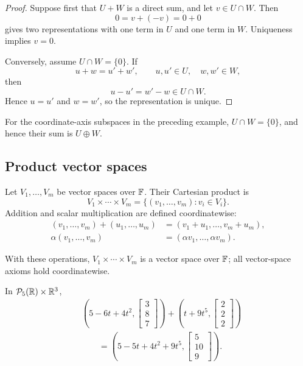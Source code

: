 \begin{proof}
  Suppose first that $U+W$ is a direct sum, and let $v\in U\cap W$.
  Then
  \[
    0=v+(-v)=0+0
  \]
  gives two representations with one term in $U$ and one term in $W$.
  Uniqueness implies $v=0$.

  Conversely, assume $U\cap W=\{0\}$. If
  \[
    u+w=u'+w',
    \qquad u,u'\in U,\quad w,w'\in W,
  \]
  then
  \[
    u-u'=w'-w\in U\cap W.
  \]
  Hence $u=u'$ and $w=w'$, so the representation is unique.
\end{proof}

For the coordinate-axis subspaces in the preceding example,
$U\cap W=\{0\}$, and hence their sum is $U\oplus W$.

\subsection{Product vector spaces}

\begin{definition}
  Let $V_1,\ldots,V_m$ be vector spaces over $\mathbb{F}$. Their Cartesian
  product is
  \[
    V_1\times\cdots\times V_m
    =\{(v_1,\ldots,v_m):v_i\in V_i\}.
  \]
  Addition and scalar multiplication are defined coordinatewise:
  \begin{align*}
    (v_1,\ldots,v_m)+(u_1,\ldots,u_m)
      &=(v_1+u_1,\ldots,v_m+u_m), \\
    \alpha(v_1,\ldots,v_m)
      &=(\alpha v_1,\ldots,\alpha v_m).
  \end{align*}
\end{definition}

With these operations, $V_1\times\cdots\times V_m$ is a vector space
over $\mathbb{F}$; all vector-space axioms hold coordinatewise.

\begin{example}
  In $\mathcal P_5(\mathbb{R})\times\mathbb{R}^3$,
  \begin{align*}
    &\left(5-6t+4t^2,
      \begin{bmatrix}3\\8\\7\end{bmatrix}\right)
    +\left(t+9t^5,
      \begin{bmatrix}2\\2\\2\end{bmatrix}\right) \\
    &\qquad=
    \left(5-5t+4t^2+9t^5,
      \begin{bmatrix}5\\10\\9\end{bmatrix}\right).
  \end{align*}
\end{example}
